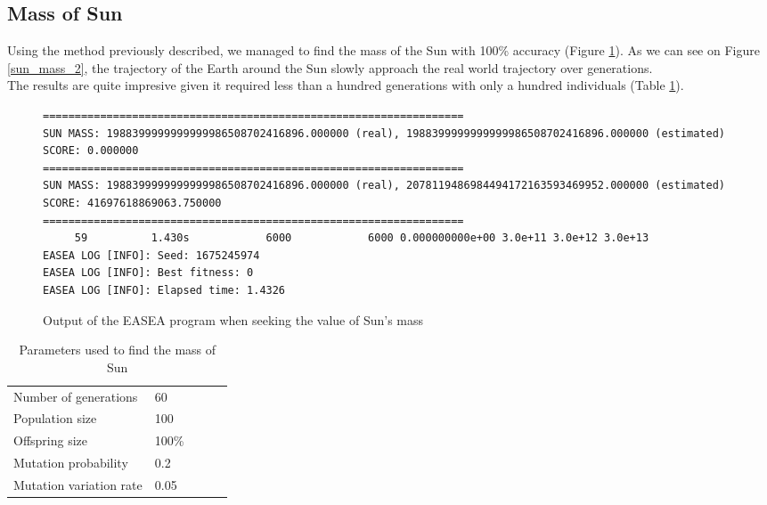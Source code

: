 \subsection{Mass of Sun}
Using the method previously described, we managed to find the mass of the Sun
with
100\% accuracy (Figure \ref{sun_mass_1}). As we can see on Figure
\ref{sun_mass_2}, the trajectory of the Earth around the Sun slowly approach
the real world trajectory over generations.\\

The results are quite impresive given it required less than a hundred
generations with only a hundred individuals (Table \ref{sun_mass_table}).

\begin{figure}
    \begin{lstlisting}
==================================================================
SUN MASS: 1988399999999999986508702416896.000000 (real), 1988399999999999986508702416896.000000 (estimated)
SCORE: 0.000000
==================================================================
SUN MASS: 1988399999999999986508702416896.000000 (real), 2078119486984494172163593469952.000000 (estimated)
SCORE: 41697618869063.750000
==================================================================
     59          1.430s            6000            6000 0.000000000e+00 3.0e+11 3.0e+12 3.0e+13
EASEA LOG [INFO]: Seed: 1675245974
EASEA LOG [INFO]: Best fitness: 0
EASEA LOG [INFO]: Elapsed time: 1.4326
\end{lstlisting}
    \caption{Output of the EASEA program when seeking the value of Sun's mass}
    \label{sun_mass_1}
\end{figure}

\begin{table}
    \begin{tabular}{lllll}
        Number of generations   & 60    \\
        Population size         & 100   \\
        Offspring size          & 100\% \\
        Mutation probability    & 0.2   \\
        Mutation variation rate & 0.05
    \end{tabular}
    \caption{Parameters used to find the mass of Sun}
    \label{sun_mass_table}
\end{table}

